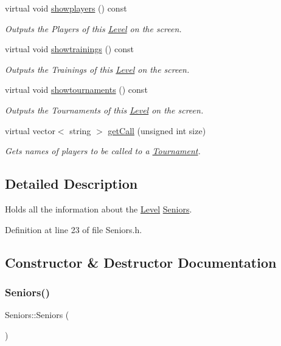 \begin{DoxyCompactItemize}
virtual void \hyperlink{class_seniors_a671c22ddbb0c2df27adf12364db0380a}{showplayers} () const
\begin{DoxyCompactList}\small\item\em Outputs the Players of this \hyperlink{class_level}{Level} on the screen. \end{DoxyCompactList}\item 
virtual void \hyperlink{class_seniors_a1f993a8ff143cc2e6dee8f3c81ed4cf3}{showtrainings} () const
\begin{DoxyCompactList}\small\item\em Outputs the Trainings of this \hyperlink{class_level}{Level} on the screen. \end{DoxyCompactList}\item 
virtual void \hyperlink{class_seniors_a5782adf80e1221220aa9e7bcaca5a3e3}{showtournaments} () const
\begin{DoxyCompactList}\small\item\em Outputs the Tournaments of this \hyperlink{class_level}{Level} on the screen. \end{DoxyCompactList}\item 
virtual vector$<$ string $>$ \hyperlink{class_seniors_a3b2fbe1e5d735c7659a195cea6333a0b}{get\+Call} (unsigned int size)
\begin{DoxyCompactList}\small\item\em Gets names of players to be called to a \hyperlink{class_tournament}{Tournament}. \end{DoxyCompactList}\end{DoxyCompactItemize}


\subsection{Detailed Description}
Holds all the information about the \hyperlink{class_level}{Level} \hyperlink{class_seniors}{Seniors}. 

Definition at line 23 of file Seniors.\+h.



\subsection{Constructor \& Destructor Documentation}
\hypertarget{class_seniors_ae02d7a048872847e295db59af893798a}{}\label{class_seniors_ae02d7a048872847e295db59af893798a} 
\subsubsection{\texorpdfstring{Seniors()}{Seniors()}\hspace{0.1cm}{\footnotesize\ttfamily [1/2]}}
{\footnotesize\ttfamily Seniors\+::\+Seniors (\begin{DoxyParamCaption}{ }\end{DoxyParamCaption})\hspace{0.3cm}{\ttfamily [inline]}}



